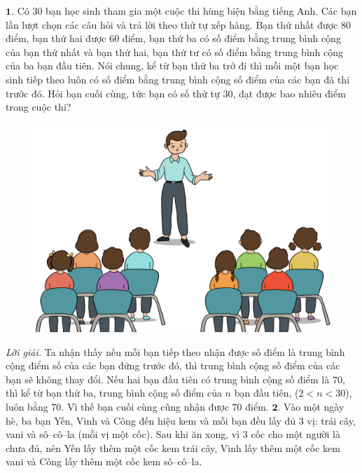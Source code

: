 \begin{multicols}{2}
	$\pmb{1.}$ Có $30$ bạn học sinh tham gia một cuộc thi hùng biện bằng tiếng Anh. Các bạn lần lượt chọn các câu hỏi và trả lời theo thứ tự xếp hàng. Bạn thứ nhất được $80$ điểm, bạn thứ hai được $60$ điểm, bạn thứ ba có số điểm bằng trung bình cộng của bạn thứ nhất và bạn thứ hai, bạn thứ tư có số điểm bằng trung bình cộng của ba bạn đầu tiên. Nói chung, kể từ bạn thứ ba trở đi thì  mỗi một bạn học sinh tiếp theo luôn có số điểm bằng trung bình cộng số điểm của các bạn đã thi trước đó. 
	\vskip 0.1cm
	Hỏi bạn cuối cùng, tức bạn có số thứ tự $30$, đạt được bao nhiêu điểm trong cuộc thi? 
	\begin{figure}[H]
		\centering
		\vspace*{-10pt}
		\captionsetup{labelformat= empty, justification=centering}
		\includegraphics[width=0.92\linewidth]{bai1}
		\vspace*{-10pt}
	\end{figure}
	\textit{Lời giải.} 	Ta nhận thấy nếu mỗi bạn tiếp theo nhận được số điểm là trung bình cộng điểm số của các bạn đứng trước đó, thì trung bình cộng số điểm của các bạn sẽ không thay đổi. Nếu hai bạn đầu tiên có trung bình cộng số điểm là $70$, thì kể từ bạn thứ ba, trung bình cộng số điểm của $n$ bạn đầu tiên, ($2\!<\!n\!<\!30$), luôn bằng $70$. Vì thế bạn cuối cùng cũng nhận được $70$ điểm.
	\vskip 0.1cm
	$\pmb{2.}$ Vào một ngày hè, ba bạn Yến, Vinh và Công đến hiệu kem và mỗi bạn đều lấy đủ $3$ vị: trái cây, vani và sô--cô--la (mỗi vị một cốc). Sau khi ăn xong, vì $3$ cốc cho một người là chưa đủ, nên Yến lấy thêm một cốc kem trái cây, Vinh lấy thêm một cốc kem vani và Công lấy thêm một cốc kem sô--cô--la. 
	\begin{figure}[H]
		\centering

\end{figure}
\end{multicols}
